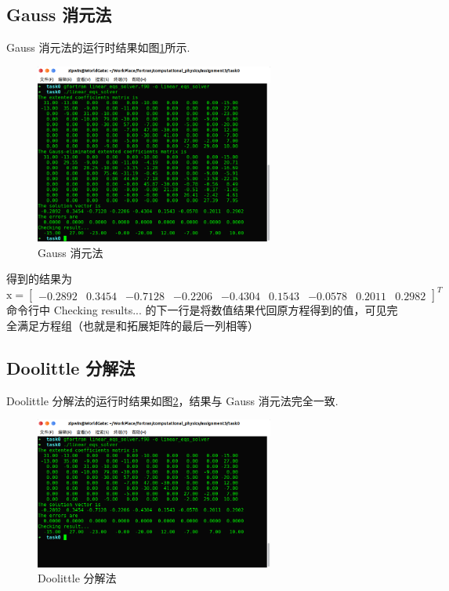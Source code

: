 \documentclass{article}
\begin{document}
	\subsection{Gauss 消元法}
	Gauss 消元法的运行时结果如图\ref{fig:rtr_gauss}所示. 
	\begin{figure}[h!tb]
		\centering
		\includegraphics[width=0.7\textwidth]{./utils/rtr_gauss.png}
		\caption{Gauss 消元法\label{fig:rtr_gauss}}
	\end{figure}
	得到的结果为
	\[
	\mathrm{x}=
	\begin{bmatrix}
	-0.2892 & 0.3454 & -0.7128 & -0.2206 & -0.4304 & 0.1543 & -0.0578 & 0.2011 & 0.2982
	\end{bmatrix}^T
	\]
	命令行中 Checking results... 的下一行是将数值结果代回原方程得到的值，可见完全满足方程组（也就是和拓展矩阵的最后一列相等）
	\subsection{Doolittle 分解法}
	Doolittle 分解法的运行时结果如图\ref{fig:rtr_doolittle}，结果与 Gauss 消元法完全一致.
	\begin{figure}[h!tb]
		\centering
		\includegraphics[width=0.7\textwidth]{./utils/rtr_doolittle.png}
		\caption{Doolittle 分解法\label{fig:rtr_doolittle}}
	\end{figure}
\end{document}
